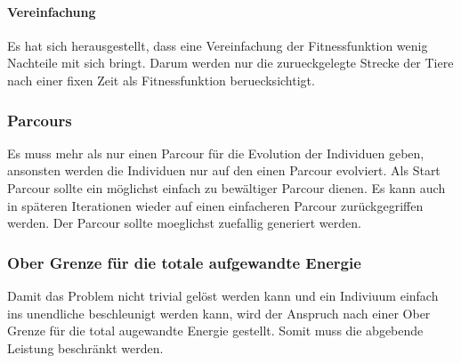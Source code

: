       \paragraph{Vereinfachung}
        Es hat sich herausgestellt, dass eine Vereinfachung der Fitnessfunktion wenig Nachteile mit sich bringt.
        Darum werden nur die zurueckgelegte Strecke der Tiere nach einer fixen Zeit als Fitnessfunktion beruecksichtigt.
    \subsubsection{Parcours}
      Es muss mehr als nur einen Parcour für die Evolution der Individuen geben,
      ansonsten werden die Individuen nur auf den einen Parcour evolviert.
      Als Start Parcour sollte ein möglichst einfach zu bewältiger Parcour dienen.
      Es kann auch in späteren Iterationen wieder auf einen einfacheren Parcour zurückgegriffen werden.
      Der Parcour sollte moeglichst zuefallig generiert werden.
    \subsubsection{Ober Grenze für die totale aufgewandte Energie}
      Damit das Problem nicht trivial gelöst werden kann und ein Indiviuum einfach ins unendliche beschleunigt werden kann,
      wird der Anspruch nach einer Ober Grenze für die total augewandte Energie gestellt. Somit muss die abgebende Leistung beschränkt werden.
